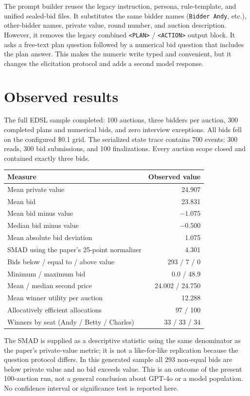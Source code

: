 \documentclass[11pt]{article}
\begin{document}
The prompt builder reuses the legacy instruction, persona, rule-template, and unified sealed-bid files. It substitutes the same bidder names (\texttt{Bidder Andy}, etc.), other-bidder names, private value, round number, and auction description. However, it removes the legacy combined \texttt{<PLAN>} / \texttt{<ACTION>} output block. It asks a free-text plan question followed by a numerical bid question that includes the plan answer. This makes the numeric write typed and convenient, but it changes the elicitation protocol and adds a second model response.

\section{Observed results}

The full EDSL sample completed: 100 auctions, three bidders per auction, 300 completed plans and numerical bids, and zero interview exceptions. All bids fell on the configured \$0.1 grid. The serialized state trace contains 700 events: 300 reads, 300 bid submissions, and 100 finalizations. Every auction scope closed and contained exactly three bids.

\begin{center}
\begin{tabular}{lr}
\toprule
Measure & Observed value \\
\midrule
Mean private value & 24.907 \\
Mean bid & 23.831 \\
Mean bid minus value & $-1.075$ \\
Median bid minus value & $-0.500$ \\
Mean absolute bid deviation & 1.075 \\
SMAD using the paper's 25-point normalizer & 4.301 \\
Bids below / equal to / above value & 293 / 7 / 0 \\
Minimum / maximum bid & 0.0 / 48.9 \\
Mean / median second price & 24.002 / 24.750 \\
Mean winner utility per auction & 12.288 \\
Allocatively efficient allocations & 97 / 100 \\
Winners by seat (Andy / Betty / Charles) & 33 / 33 / 34 \\
\bottomrule
\end{tabular}
\end{center}

The SMAD is supplied as a descriptive statistic using the same denominator as the paper's private-value metric; it is not a like-for-like replication because the question protocol differs. In this generated sample all 293 non-equal bids are below private value and no bid exceeds value. This is an outcome of the present 100-auction run, not a general conclusion about GPT-4o or a model population. No confidence interval or significance test is reported here.
\end{document}
